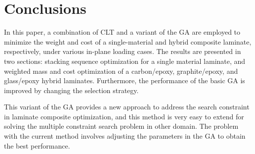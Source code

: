 \section{Conclusions}
In this paper, a combination of CLT and a variant of the GA are employed to minimize the weight and cost
of a single-material and hybrid composite laminate, respectively, under various in-plane loading
cases. The results are presented in two sections: stacking sequence optimization for a single material
laminate, and weighted mass and cost optimization of a carbon/epoxy, graphite/epoxy, and
glass/epoxy hybrid laminates. Furthermore, the performance of the basic GA is improved by changing the
selection strategy.

This variant of the GA provides a new approach to address the search constraint in laminate composite
optimization, and this method is very easy to extend for solving the multiple constraint search problem in other
domain. The problem with the current method involves adjusting the parameters in the GA to obtain the best
performance.
